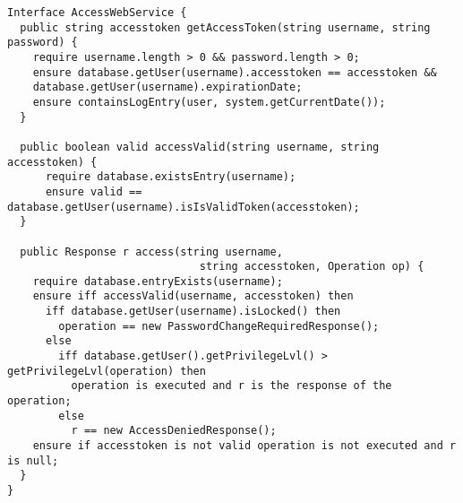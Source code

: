 \begin{verbatim}
Interface AccessWebService {
  public string accesstoken getAccessToken(string username, string password) {
    require username.length > 0 && password.length > 0;
    ensure database.getUser(username).accesstoken == accesstoken &&
    database.getUser(username).expirationDate;
    ensure containsLogEntry(user, system.getCurrentDate());
  }

  public boolean valid accessValid(string username, string accesstoken) {
	  require database.existsEntry(username);
	  ensure valid == database.getUser(username).isIsValidToken(accesstoken);
  }

  public Response r access(string username,
                              string accesstoken, Operation op) {
    require database.entryExists(username);
    ensure iff accessValid(username, accesstoken) then
      iff database.getUser(username).isLocked() then
        operation == new PasswordChangeRequiredResponse();
      else
        iff database.getUser().getPrivilegeLvl() > getPrivilegeLvl(operation) then
          operation is executed and r is the response of the operation;
        else
          r == new AccessDeniedResponse();
    ensure if accesstoken is not valid operation is not executed and r is null;
  }
}
\end{verbatim}

